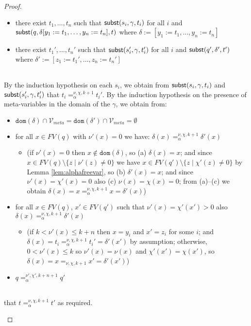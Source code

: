 \documentclass{lmcs}
\theoremstyle{theorem}\newtheorem{theorem}{Theorem}
\theoremstyle{theorem}\newtheorem{lemma}[theorem]{Lemma}
\theoremstyle{theorem}\newtheorem{corollary}[theorem]{Corollary}
\theoremstyle{definition}\newtheorem{definition}[theorem]{Definition}
\theoremstyle{definition}\newtheorem{example}[theorem]{Example}
\newcommand{\Vmeta}{\mathcal{V}_{\mathit{meta}}}
\newcommand{\FV}{\mathit{FV}}
\newcommand{\domain}{\mathtt{dom}}
\newcommand{\avar}{x}
\newcommand{\bvar}{y}
\newcommand{\cvar}{z}
\begin{document}
\begin{proof}
{\begin{itemize}
\begin{itemize}
      \item there exist $t_1,\dots,t_n$ such that $\mathsf{subst}(s_i,\gamma,t_i)$ for all $i$ and
        $\subrel{q,\delta[\bvar_1:=t_1,\dots,\bvar_n:=t_n],t}$ where $\delta := [\bvar_1:=t_1,\dots,\bvar_n:=t_n]$
      \item there exist $t_1',\dots,t_n'$ such that $\mathsf{subst}(s_i',\gamma,t_i')$ for all $i$ and
        $\mathsf{subst}(q',\delta',t')$ where $\delta' := [\cvar_1:=t_1',\dots,\cvar_n:=t_n']$
      \end{itemize}
      \ \\
      By the induction hypothesis on each $s_i$, we obtain from $\mathsf{subst}(s_i,\gamma,t_i)$ and $\mathsf{subst}(s_i',\gamma,t_i')$ that
      $t_i =_\alpha^{\nu,\chi,k+1} t_i'$.
      By the induction hypothesis on the presence of meta-variables in the domain of the $\gamma$, we obtain from:
      \begin{itemize}
      \item $\domain(\delta) \cap \Vmeta = \domain(\delta') \cap \Vmeta = \emptyset$
      \item for all $\avar \in \FV(q)$ with $\nu'(\avar) = 0$ we have:
        $\delta(\avar) =_\alpha^{\nu,\chi,k+1} \delta'(\avar)$
        \begin{itemize}
        \item[]
          (if $\nu'(\avar) = 0$ then $\avar \notin \domain(\delta)$, so (a) $\delta(\avar) = \avar$;
          and since $\avar \in \FV(q) \setminus \{ \cvar \mid \nu'(\cvar) \neq 0 \}$ we have
          $\avar \in \FV(q') \setminus \{ \cvar \mid \chi'(\cvar) \neq 0 \}$ by Lemma
          \ref{lem:alphafreevar}, so (b) $\delta'(\avar) = \avar$;
          and since $\nu'(\avar) = \chi'(\avar) = 0$ also (c) $\nu(\avar) = \chi(\avar) = 0$;
          from (a)--(c) we obtain $\delta(\avar) = \avar =_\alpha^{\nu,\chi,k+1} \avar = \delta'(\avar)$)
        \end{itemize}
      \item for all $\avar \in \FV(q)$, $\avar' \in \FV(q')$ such that $\nu'(\avar) = \chi'(\avar') > 0$
        also $\delta(\avar) =_\alpha^{\nu,\chi,k+1} \delta'(\avar)$
        \begin{itemize}
        \item[]
          (if $k < \nu'(\avar) \leq k+n$ then $\avar = \bvar_i$ and $\avar' = \cvar_i$ for some $i$;
          and $\delta(\avar) = t_i =_\alpha^{\nu,\chi,k+1} t_i' = \delta'(\avar')$ by assumption;
          otherwise, $0 < \nu'(\avar) \leq k$ so $\nu'(\avar) = \nu(\avar)$ and $\chi'(\avar') =
          \chi(\avar')$, so $\delta(\avar) = \avar =_{\nu,\chi,k+1} \avar' = \delta'(\avar')$)
        \end{itemize}
      \item $q =_\alpha^{\nu',\chi',k+n+1} q'$
      \end{itemize}
      \ \\
      that $t =_\alpha^{\nu,\chi,k+1} t'$ as required.
      \qedhere
    \end{itemize}
}
\end{proof}
\end{document}
